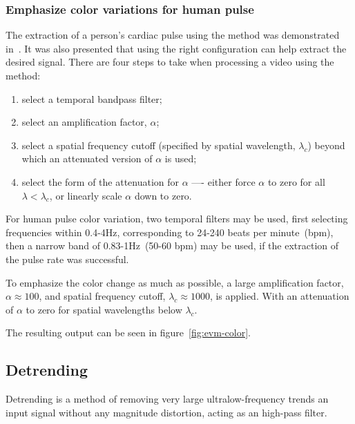 \subsubsection{Emphasize color variations for human pulse} \label{sec:sota:evm:color}


The extraction of a person's cardiac pulse using the \evm{} method
was demonstrated in~\cite{Wu2012Eulerian}. It was also presented that
using the right configuration can help extract the desired signal.
There are four steps to take when processing a video using the \evm{} method:

\begin{enumerate}
  \item select a temporal bandpass filter;
  \item select an amplification factor, $\alpha$;
  \item select a spatial frequency cutoff (specified by spatial wavelength,
        $\lambda_c$) beyond which an attenuated version of $\alpha$ is used;
  \item select the form of the attenuation for $\alpha$ —- either force
        $\alpha$ to zero for all $\lambda < \lambda_c$, or linearly scale
        $\alpha$ down to zero.
\end{enumerate}

For human pulse color variation, two temporal filters may be used, first
selecting frequencies within 0.4-4Hz, corresponding to 24-240 beats per
minute~(bpm), then a narrow band of 0.83-1Hz~(50-60 bpm) may be used,
if the extraction of the pulse rate was successful.

To emphasize the color change as much as possible, a large amplification
factor, $\alpha \approx 100$, and spatial frequency cutoff,
$\lambda_c \approx 1000$, is applied. With an attenuation of $\alpha$ to
zero for spatial wavelengths below $\lambda_c$.

The resulting output can be seen in figure~\ref{fig:evm-color}.

\subsection{Detrending} \label{sec:sota:post:detrend}

Detrending is a method of removing very large ultralow-frequency trends an
input signal without any magnitude distortion, acting as an high-pass filter.

